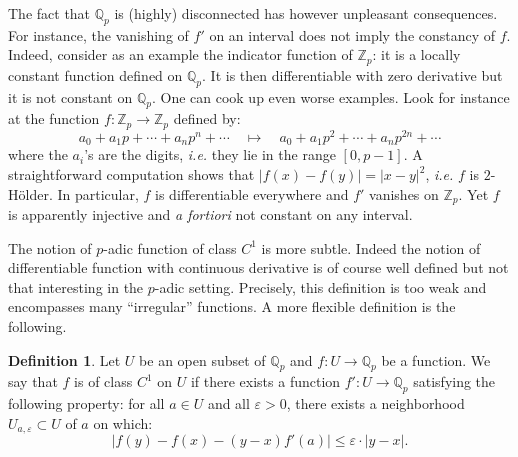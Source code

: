 \documentclass[11pt]{article}
\numberwithin{equation}{section}
\numberwithin{figure}{section}
\renewcommand{\leq}{\leqslant}
\theoremstyle{definition}
\newtheorem{deftn}[theo]{Definition}
\newcommand{\Z}{\mathbb Z}
\newcommand{\Zp}{\Z_p}
\newcommand{\Q}{\mathbb Q}
\newcommand{\Qp}{\Q_p}
\begin{document}
The fact that $\Qp$ is (highly) disconnected has however unpleasant 
consequences. For instance, the vanishing of $f'$ on an interval does
not imply the constancy of $f$. Indeed, consider as an example the
indicator function of $\Zp$: it is a locally constant function defined 
on $\Qp$. It is then differentiable with zero derivative but it
is not constant on $\Qp$.
One can cook up even worse examples. Look for instance at the 
function $f : \Zp \to \Zp$ defined by:
$$a_0 + a_1 p + \cdots + a_n p^n + \cdots \quad \mapsto \quad
a_0 + a_1 p^2 + \cdots + a_n p^{2n} + \cdots$$
where the $a_i$'s are the digits, \emph{i.e.} they lie in the range
$[0,p{-}1]$. A straightforward computation shows that $|f(x) - f(y)| 
= |x-y|^2$, \emph{i.e.} $f$ is $2$-Hölder. In particular, $f$ is
differentiable everywhere and $f'$ vanishes on $\Zp$. Yet $f$ is 
apparently injective and \emph{a fortiori} not constant on any
interval.

\medskip

The notion of $p$-adic function of class $C^1$ is more subtle. Indeed 
the notion of differentiable function with continuous derivative is of 
course well defined but not that interesting in the $p$-adic setting. 
Precisely, this definition is too weak and encompasses many 
``irregular'' functions. A more flexible definition is the
following.

\begin{deftn}
\label{def:classC1}
Let $U$ be an open subset of $\Qp$ and $f : U \to \Qp$ be a function.
We say that $f$ is of class $C^1$ on $U$ if there exists a function
$f' : U \to \Qp$ satisfying the following property: for all $a \in U$ 
and all $\varepsilon > 0$, there exists a neighborhood $U_{a,\varepsilon}
\subset U$ of $a$ on which:
\begin{equation}
\label{eq:defC1uni}
\big|f(y) - f(x) - (y{-}x) f'(a)\big| \leq  \varepsilon \cdot 
|y{-}x|.
\end{equation}
\end{deftn}
\end{document}
